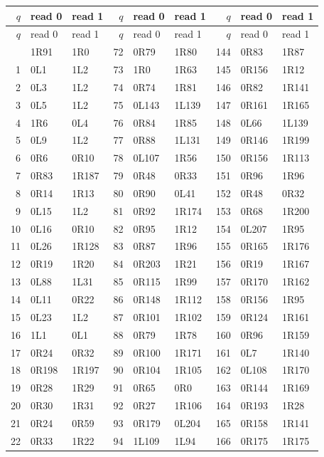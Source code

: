 \footnotesize
\begin{longtable}{@{}rll@{\qquad}rll@{\qquad}rll@{}}
\toprule
$q$ & read 0 & read 1 & $q$ & read 0 & read 1 & $q$ & read 0 & read 1\\
\midrule\endfirsthead
\toprule
$q$ & read 0 & read 1 & $q$ & read 0 & read 1 & $q$ & read 0 & read 1\\
\midrule\endhead
\bottomrule\endfoot
0 & 1R91 & 1R0 & 72 & 0R79 & 1R80 & 144 & 0R83 & 1R87\\
1 & 0L1 & 1L2 & 73 & 1R0 & 1R63 & 145 & 0R156 & 1R12\\
2 & 0L3 & 1L2 & 74 & 0R74 & 1R81 & 146 & 0R82 & 1R141\\
3 & 0L5 & 1L2 & 75 & 0L143 & 1L139 & 147 & 0R161 & 1R165\\
4 & 1R6 & 0L4 & 76 & 0R84 & 1R85 & 148 & 0L66 & 1L139\\
5 & 0L9 & 1L2 & 77 & 0R88 & 1L131 & 149 & 0R146 & 1R199\\
6 & 0R6 & 0R10 & 78 & 0L107 & 1R56 & 150 & 0R156 & 1R113\\
7 & 0R83 & 1R187 & 79 & 0R48 & 0R33 & 151 & 0R96 & 1R96\\
8 & 0R14 & 1R13 & 80 & 0R90 & 0L41 & 152 & 0R48 & 0R32\\
9 & 0L15 & 1L2 & 81 & 0R92 & 1R174 & 153 & 0R68 & 1R200\\
10 & 0L16 & 0R10 & 82 & 0R95 & 1R12 & 154 & 0L207 & 1R95\\
11 & 0L26 & 1R128 & 83 & 0R87 & 1R96 & 155 & 0R165 & 1R176\\
12 & 0R19 & 1R20 & 84 & 0R203 & 1R21 & 156 & 0R19 & 1R167\\
13 & 0L88 & 1L31 & 85 & 0R115 & 1R99 & 157 & 0R170 & 1R162\\
14 & 0L11 & 0R22 & 86 & 0R148 & 1R112 & 158 & 0R156 & 1R95\\
15 & 0L23 & 1L2 & 87 & 0R101 & 1R102 & 159 & 0R124 & 1R161\\
16 & 1L1 & 0L1 & 88 & 0R79 & 1R78 & 160 & 0R96 & 1R159\\
17 & 0R24 & 0R32 & 89 & 0R100 & 1R171 & 161 & 0L7 & 1R140\\
18 & 0R198 & 1R197 & 90 & 0R104 & 1R105 & 162 & 0L108 & 1R170\\
19 & 0R28 & 1R29 & 91 & 0R65 & 0R0 & 163 & 0R144 & 1R169\\
20 & 0R30 & 1R31 & 92 & 0R27 & 1R106 & 164 & 0R193 & 1R28\\
21 & 0R24 & 0R59 & 93 & 0R179 & 0L204 & 165 & 0R158 & 1R141\\
22 & 0R33 & 1R22 & 94 & 1L109 & 1L94 & 166 & 0R175 & 1R175\\

\end{longtable}
